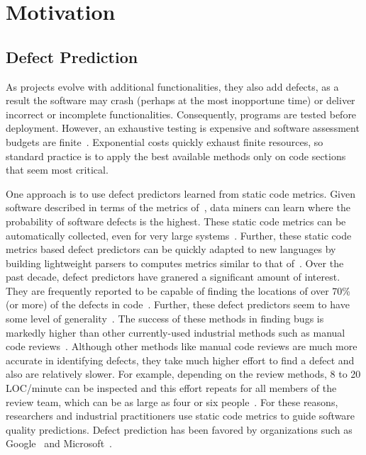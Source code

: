 \section{Motivation}
\label{sect:motivate}
\subsection{Defect Prediction}
\label{sect:defect_prediction}

As projects evolve with additional functionalities, they also add defects, as a result the software may crash (perhaps at the most inopportune time) or  deliver incorrect or incomplete functionalities. Consequently, programs are tested before deployment. However, an exhaustive testing is expensive and software assessment budgets are finite~\citep{LowryBK98}.  Exponential  costs  quickly  exhaust  finite resources, so  standard  practice  is  to  apply  the  best  available methods only on code sections that seem most critical. 

One approach is to use defect predictors learned from static code metrics. Given software described in terms of the metrics of~, data miners can learn where the probability of software defects is the highest. These static code metrics can be automatically collected, even for very large systems~\citep{nagappan05}. Further, these static code metrics based defect predictors can be quickly adapted to new languages by building lightweight parsers to computes metrics similar to that of~. Over the past decade, defect predictors have granered a significant amount of interest. They are frequently reported to be capable of finding the locations of over  70\% (or more) of the defects in code~\citep{me07b,Nam13,fu,ghotra2015revisiting,lessmann08,fu18,krishna17b}. Further, these defect predictors seem to have some level of generality~\cite{Nam13,Nam15,krishna16,krishna17b}. The success of these methods in finding bugs is markedly higher than other currently-used industrial methods such as manual code reviews~\citep{shu02}. Although other methods like  manual code reviews are much more accurate in identifying defects, they take much higher effort to find a defect and also are relatively slower. For example, depending on the review methods, 8 to 20 LOC/minute can be inspected and this effort repeats for all members of the review team, which can be as large as four or six people~\citep{me02f}. For these reasons, researchers and industrial practitioners use static code metrics to guide software  quality predictions. Defect prediction has been favored by organizations such as Google~\cite{lewis13} and Microsoft~\citep{Zimmermann09}. 

